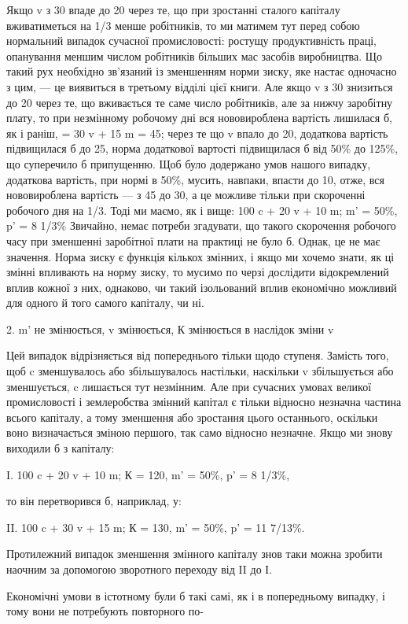 Якщо v з 30 впаде до 20 через те, що при зростанні сталого
капіталу вживатиметься на 1/3 менше робітників, то ми матимем
тут перед собою нормальний випадок сучасної промисловості:
ростущу продуктивність праці, опанування меншим числом робітників
більших мас засобів виробництва. Що такий рух необхідно
зв'язаний із зменшенням норми зиску, яке настає одночасно
з цим, — це виявиться в третьому відділі цієї книги.
       Але якщо v з 30 знизиться до 20 через те, що вживається
те саме число робітників, але за нижчу заробітну плату, то при
незмінному робочому дні вся нововироблена вартість лишилася
б, як і раніш, = 30 v + 15 m = 45; через те що v впало до 20,
додаткова вартість підвищилася б до 25, норма додаткової
вартості підвищилася б від 50\%  до 125\%, що суперечило б
припущенню. Щоб було додержано умов нашого випадку, додаткова
вартість, при нормі в 50\%, мусить, навпаки, впасти до
10, отже, вся нововироблена вартість — з 45 до 30, а це можливе
тільки при скороченні робочого дня на 1/3. Тоді ми маємо,
як і вище:
                        100 c + 20 v + 10 m; m' = 50\%, p' = 8 1/3\%
      Звичайно, немає потреби згадувати, що такого скорочення
робочого часу при зменшенні заробітної плати на практиці не
було б. Однак, це не має значення. Норма зиску є функція
кількох змінних, і якщо ми хочемо знати, як ці змінні впливають
на норму зиску, то мусимо по черзі дослідити відокремлений
вплив кожної з них, однаково, чи такий ізольований вплив
економічно можливий для одного й того самого капіталу, чи ні.

                       2. m' не  змінюється, v змінюється, К змінюється
                                                    в наслідок зміни v

Цей випадок відрізняється від попереднього тільки щодо
ступеня. Замість того, щоб c зменшувалось або збільшувалось
настільки, наскільки v збільшується або зменшується, c лишається
тут незмінним. Але при сучасних умовах великої промисловості
і землеробства змінний капітал є тільки відносно
незначна частина всього капіталу, а тому зменшення або зростання
цього останнього, оскільки воно визначається зміною
першого, так само відносно незначне. Якщо ми знову виходили
б з капіталу:

I.    100 c + 20 v + 10 m; К = 120, m' = 50\%, p' = 8 1/3\%,

то він перетворився б, наприклад, у:

II.    100 c + 30 v + 15 m; К = 130, m' = 50\%, p' = 11 7/13\%.

Протилежний випадок зменшення змінного капіталу знов
таки можна зробити наочним за допомогою зворотного переходу
від II до І.

Економічні умови в істотному були б такі самі, як і в попередньому
випадку, і тому вони не потребують повторного по-
\parbreak{}  %
